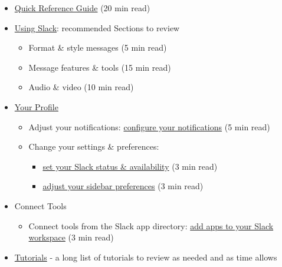\documentclass[
]{book}
\providecommand{\tightlist}{%
  \setlength{\itemsep}{0pt}\setlength{\parskip}{0pt}}
\begin{document}
\begin{itemize}
\tightlist
\item
  \href{https://slack.com/help/articles/360059928654-How-to-use-Slack--your-quick-start-guide\#sidebar}{Quick Reference Guide} (20 min read)
\item
  \href{https://slack.com/help/categories/200111606}{Using Slack}: recommended Sections to review

  \begin{itemize}
  \tightlist
  \item
    Format \& style messages (5 min read)
  \item
    Message features \& tools (15 min read)
  \item
    Audio \& video (10 min read)
  \end{itemize}
\item
  \href{https://slack.com/help/categories/360000047906}{Your Profile}

  \begin{itemize}
  \tightlist
  \item
    Adjust your notifications: \href{https://slack.com/help/articles/201355156-Configure-your-Slack-notifications}{configure your notifications} (5 min read)
  \item
    Change your settings \& preferences:

    \begin{itemize}
    \tightlist
    \item
      \href{https://slack.com/help/articles/201864558-Set-your-Slack-status-and-availability}{set your Slack status \& availability} (3 min read)
    \item
      \href{https://slack.com/help/articles/212596808-Adjust-your-sidebar-preferences}{adjust your sidebar preferences} (3 min read)
    \end{itemize}
  \end{itemize}
\item
  Connect Tools

  \begin{itemize}
  \tightlist
  \item
    Connect tools from the Slack app directory: \href{https://slack.com/help/articles/202035138-Add-apps-to-your-Slack-workspace}{add apps to your Slack workspace} (3 min read)
  \end{itemize}
\item
  \href{https://slack.com/help/categories/360000049063}{Tutorials} - a long list of tutorials to review as needed and as time allows
\end{itemize}
\end{document}
